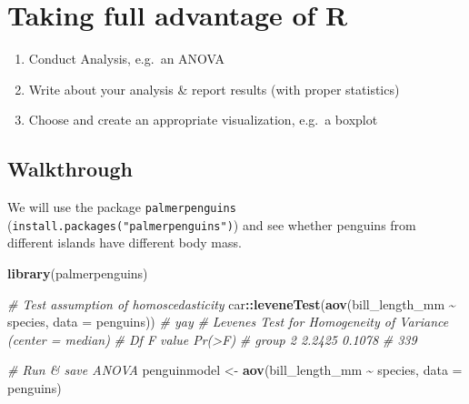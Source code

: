 \documentclass[
]{book}
\newenvironment{Shaded}{\begin{snugshade}}{\end{snugshade}}
\newcommand{\AttributeTok}[1]{\textcolor[rgb]{0.13,0.29,0.53}{#1}}
\newcommand{\CommentTok}[1]{\textcolor[rgb]{0.56,0.35,0.01}{\textit{#1}}}
\newcommand{\FunctionTok}[1]{\textcolor[rgb]{0.13,0.29,0.53}{\textbf{#1}}}
\newcommand{\NormalTok}[1]{#1}
\newcommand{\OtherTok}[1]{\textcolor[rgb]{0.56,0.35,0.01}{#1}}
\newcommand{\SpecialCharTok}[1]{\textcolor[rgb]{0.81,0.36,0.00}{\textbf{#1}}}
\providecommand{\tightlist}{%
  \setlength{\itemsep}{0pt}\setlength{\parskip}{0pt}}
\begin{document}
\section{Taking full advantage of R}\label{taking-full-advantage-of-r}

\begin{enumerate}
\def\labelenumi{\arabic{enumi}.}
\tightlist
\item
  Conduct Analysis, e.g.~an ANOVA
\item
  Write about your analysis \& report results (with proper statistics)
\item
  Choose and create an appropriate visualization, e.g.~a boxplot
\end{enumerate}

\subsection{Walkthrough}\label{walkthrough}

We will use the package \texttt{palmerpenguins} (\texttt{install.packages("palmerpenguins")}) and see whether penguins from different islands have different body mass.

\begin{Shaded}
\begin{Highlighting}[]
\FunctionTok{library}\NormalTok{(palmerpenguins)}

\CommentTok{\# Test assumption of homoscedasticity}
\NormalTok{car}\SpecialCharTok{::}\FunctionTok{leveneTest}\NormalTok{(}\FunctionTok{aov}\NormalTok{(bill\_length\_mm }\SpecialCharTok{\textasciitilde{}}\NormalTok{ species, }\AttributeTok{data =}\NormalTok{ penguins)) }\CommentTok{\# yay}
\CommentTok{\# Levene\textquotesingle{}s Test for Homogeneity of Variance (center = median)}
\CommentTok{\#        Df F value Pr(\textgreater{}F)}
\CommentTok{\# group   2  2.2425 0.1078}
\CommentTok{\#       339}
\end{Highlighting}
\end{Shaded}

\begin{Shaded}
\begin{Highlighting}[]
\CommentTok{\# Run \& save ANOVA}
\NormalTok{penguinmodel }\OtherTok{\textless{}{-}} \FunctionTok{aov}\NormalTok{(bill\_length\_mm }\SpecialCharTok{\textasciitilde{}}\NormalTok{ species, }\AttributeTok{data =}\NormalTok{ penguins)}
\end{Highlighting}
\end{Shaded}
\end{document}
